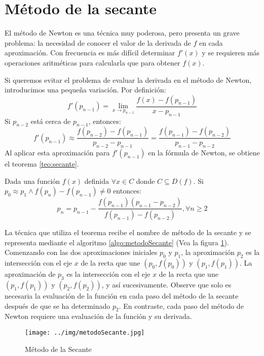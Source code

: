 \section{Método de la secante}
El método de Newton es una técnica muy poderosa, pero presenta un grave problema: la necesidad de conocer el valor de 
la derivada de $f$ en cada aproximación.
Con frecuencia es más difícil determinar $f'(x)$ y se requieren más operaciones aritméticas para calcularla que para 
obtener $f(x)$. 

Si queremos evitar el problema de evaluar la derivada en el método de Newton, introducimos una pequeña variación. Por definición:
$$f'(p_{n-1}) = \lim_{x\rightarrow p_{n-1}}\frac{f(x) - f(p_{n-1})}{x - p_{n-1}} $$
Si $p_{n-2}$ está cerca de $p_{n-1}$, entonces:
$$f'(p_{n-1}) \approx \frac{f(p_{n-2}) - f(p_{n-1})}{p_{n-2} - p_{n-1}} = \frac{f(p_{n-1}) - f(p_{n-2})}{p_{n-1} - p_{n-2}}$$
Al aplicar esta aproximación para $f'(p_{n-1})$ en la fórmula de Newton, se obtiene el teorema \ref{teo:secante}.

\begin{theorem}
	Dada una función $f(x)$ definida $\forall x\in C$ donde $C\subseteq D(f)$. Si $p_0\approx p_1 \wedge f(p_n)-f(p_{n-1})\not=0$ 
	entonces:
	\[p_{n} = p_{n-1} - \frac{f(p_{n-1}) (p_{n-1} - p_{n-2})}{f(p_{n-1}) - f(p_{n-2})}, \forall n\geq 2\]
	\label{teo:secante}
\end{theorem}

La técnica que utiliza el teorema recibe el nombre de método de la secante y se representa mediante el algoritmo 
\ref{algo:metodoSecante} (Vea la figura \ref{fig:metodoSecante}). Comenzando con las 
dos aproximaciones iniciales $p_{0}$ y $p_{1}$, la aproximación $p_2$ es la intersección con el eje $x$ de la recta que une 
$(p_0, f(p_0))$ y $(p_1, f(p_1))$. La aproximación de $p_3$ es la intersección con el eje $x$ de la recta que une $(p_1, f(p_1))$ 
y $(p_2, f(p_2))$, y así sucesivamente. Observe que solo es necesaria la evaluación de la función en cada paso del método de la 
secante después de que se ha determinado $p_2$. En contraste, cada paso del método de Newton requiere una evaluación de
la función y su derivada.

\begin{figure}[H]
	\centering
    \texttt{[image: ../img/metodoSecante.jpg]}
    \caption{Método de la Secante}
    \label{fig:metodoSecante}
\end{figure}   

